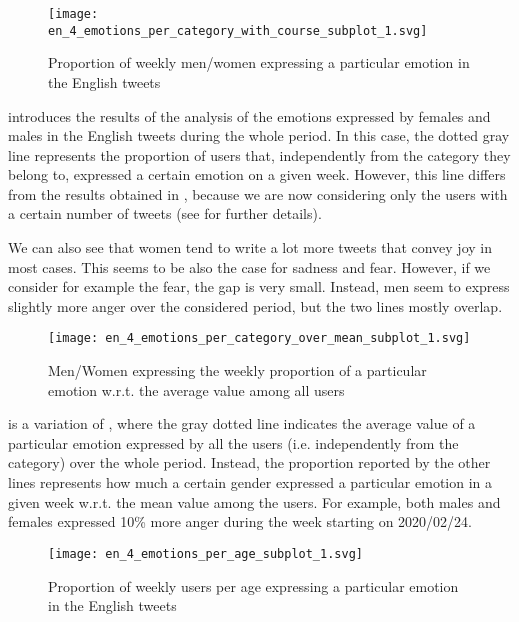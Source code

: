 \begin{figure}[H]
	\centering
    	\texttt{[image: en\_4\_emotions\_per\_category\_with\_course\_subplot\_1.svg]}
    	\caption{Proportion of weekly men/women expressing a particular emotion in the English tweets}
    	\label{fig:en-4-emotions-per-category-course-subplot-1}
\end{figure}

 introduces the results of the analysis of the emotions expressed by females and males in the English tweets during the whole period. In this case, the dotted gray line represents the proportion of users that, independently from the category they belong to, expressed a certain emotion on a given week. However, this line differs from the results obtained in , because we are now considering only the users with a certain number of tweets (see  for further details).

We can also see that women tend to write a lot more tweets that convey joy in most cases. This seems to be also the case for sadness and fear. However, if we consider for example the fear, the gap is very small. Instead, men seem to express slightly more anger over the considered period, but the two lines mostly overlap.

\begin{figure}[H]
	\centering
    	\texttt{[image: en\_4\_emotions\_per\_category\_over\_mean\_subplot\_1.svg]}
    	\caption{Men/Women expressing the weekly proportion of a particular emotion w.r.t. the average value among all users}
    	\label{fig:en-4-emotions-per-category-course-mean-1}
\end{figure}

 is a variation of , where the gray dotted line indicates the average value of a particular emotion expressed by all the users (i.e. independently from the category) over the whole period. Instead, the proportion reported by the other lines represents how much a certain gender expressed a particular emotion in a given week w.r.t. the mean value among the users. For example, both males and females expressed 10\% more anger during the week starting on 2020/02/24.

\begin{figure}[H]
	\centering
    	\texttt{[image: en\_4\_emotions\_per\_age\_subplot\_1.svg]}
    	\caption{Proportion of weekly users per age expressing a particular emotion in the English tweets}
    	\label{fig:en-4-emotions-per-age-subplot-1}
\end{figure}

